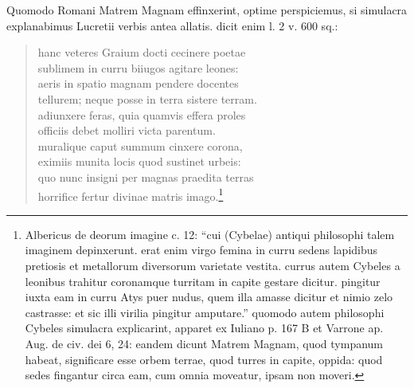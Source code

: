 \documentclass[a4paper, 11pt, oneside, polutonikogreek, german, twocolumn]{article}
\begin{document}
Quomodo Romani Matrem Magnam effinxerint, optime perspiciemus, si simulacra explanabimus Lucretii verbis antea allatis. dicit enim l. 2 v. 600 sq.:
\begin{quotation}
hanc veteres Graium docti cecinere poetae\\\hspace*{5mm}sublimem in curru biiugos agitare leones:\\\hspace*{5mm}aeris in spatio magnam pendere docentes\\\hspace*{5mm}tellurem; neque posse in terra sistere terram.\\\hspace*{5mm}adiunxere feras, quia quamvis effera proles\\\hspace*{5mm}officiis debet molliri victa parentum.\\\hspace*{5mm}muralique caput summum cinxere corona,\\\hspace*{5mm}eximiis munita locis quod sustinet urbeis:\\\hspace*{5mm}quo nunc insigni per magnas praedita terras\\\hspace*{5mm}horrifice fertur divinae matris imago.\footnote{Albericus de deorum imagine c. 12: "`cui (Cybelae) antiqui philosophi talem imaginem depinxerunt. erat enim virgo femina in curru sedens lapidibus pretiosis et metallorum diversorum varietate vestita. currus autem Cybeles a leonibus trahitur coronamque turritam in capite gestare dicitur. pingitur iuxta eam in curru Atys puer nudus, quem illa amasse dicitur et nimio zelo castrasse: et sic illi virilia pingitur amputare."' quomodo autem philosophi Cybeles simulacra explicarint, apparet ex Iuliano p. 167 B et Varrone ap. Aug. de civ. dei 6, 24: eandem dicunt Matrem Magnam, quod tympanum habeat, significare esse orbem terrae, quod turres in capite, oppida: quod sedes fingantur circa eam, cum omnia moveatur, ipsam non moveri.}
\end{quotation}
\end{document}
